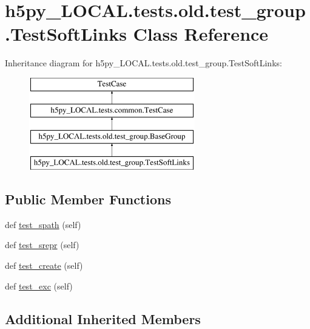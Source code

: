 \hypertarget{classh5py__LOCAL_1_1tests_1_1old_1_1test__group_1_1TestSoftLinks}{}\section{h5py\+\_\+\+L\+O\+C\+A\+L.\+tests.\+old.\+test\+\_\+group.\+Test\+Soft\+Links Class Reference}
\label{classh5py__LOCAL_1_1tests_1_1old_1_1test__group_1_1TestSoftLinks}
Inheritance diagram for h5py\+\_\+\+L\+O\+C\+A\+L.\+tests.\+old.\+test\+\_\+group.\+Test\+Soft\+Links\+:\begin{figure}[H]
\begin{center}
\leavevmode
\includegraphics[height=4.000000cm]{classh5py__LOCAL_1_1tests_1_1old_1_1test__group_1_1TestSoftLinks}
\end{center}
\end{figure}
\subsection*{Public Member Functions}
\begin{DoxyCompactItemize}
\item 
def \hyperlink{classh5py__LOCAL_1_1tests_1_1old_1_1test__group_1_1TestSoftLinks_a4ad585c4cc488be1efa6e062f20a07e9}{test\+\_\+spath} (self)
\item 
def \hyperlink{classh5py__LOCAL_1_1tests_1_1old_1_1test__group_1_1TestSoftLinks_ac2ffea89d3fcaf566ad992732719cbb0}{test\+\_\+srepr} (self)
\item 
def \hyperlink{classh5py__LOCAL_1_1tests_1_1old_1_1test__group_1_1TestSoftLinks_a494b2846bfb88c5c5c58296cc69d2b5f}{test\+\_\+create} (self)
\item 
def \hyperlink{classh5py__LOCAL_1_1tests_1_1old_1_1test__group_1_1TestSoftLinks_a06d4e89028f2eb0dad1fa61c8d8274d4}{test\+\_\+exc} (self)
\end{DoxyCompactItemize}
\subsection*{Additional Inherited Members}


